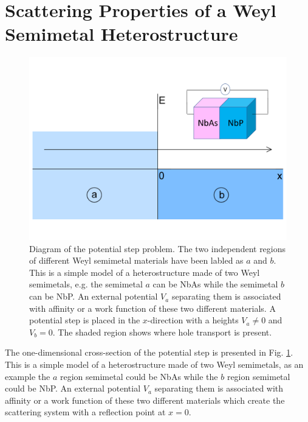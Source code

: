 \documentclass[prb,twocolumn,aps,superscriptaddress,showpacs,floatfix]{revtex4}
\begin{document}

\section{Scattering Properties of a Weyl Semimetal Heterostructure}
\begin{figure}
	\centerline{\includegraphics[scale=0.29]{weyl-step-insert2}}
	\caption{Diagram of the potential step problem. The two independent regions of different Weyl semimetal materials have been labled as $a$ and $b$. This is a simple model of a heterostructure made of two Weyl semimetals, e.g. the semimetal $a$ can be NbAs while the semimetal $b$ can be NbP. An external potential $V_a$ separating them is associated with affinity or a work function of these two different materials. A potential step is placed in the $x$-direction with a heights $V_{a}\neq 0$ and $V_{b}=0$. The shaded region shows where hole transport is present.}
	\label{weyl-step}
\end{figure}
	The one-dimensional cross-section of the  potential step is presented in Fig. \ref{weyl-step}. This is a simple model of a heterostructure made of two Weyl semimetals, as an example the $a$ region semimetal could be NbAs while the $b$ region semimetal could be NbP. An external potential $V_a$ separating them is  associated with affinity or a work function of these two different materials which create the scattering system with a reflection point at $x=0$.
\end{document}
